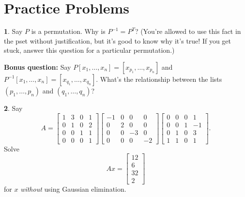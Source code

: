 \documentclass{article}
\theoremstyle{definition}
\newtheorem{prob}{}
\begin{document}
\section*{Practice Problems}
\begin{prob}
	Say $P$ is a permutation. Why is $P^{-1}=P^T$? (You're allowed to use this fact in the pset without justification, but it's good to know why it's true! If you get stuck, answer this question for a particular permutation.)
	
	\vspace{12pt}
	
	\noindent\textbf{Bonus question:} Say $P[x_1, \dots, x_n]=[x_{p_1}, \dots, x_{p_n}]$ and $P^{-1}[x_1, \dots, x_n]=[x_{q_1}, \dots, x_{q_n}]$. What's the relationship between the lists $(p_1, \dots, p_n)$ and $(q_1, \dots, q_n)$?
	
\end{prob}

\begin{prob}
	Say 
	\[A=\begin{bmatrix}
		1& 3& 0& 1\\
		0&1&0&2\\
		0&0&1&1\\
		0&0&0&1
	\end{bmatrix}
\begin{bmatrix}
	-1& 0& 0& 0\\
	0&2&0&0\\
	0&0&-3&0\\
	0&0&0&-2
\end{bmatrix}
\begin{bmatrix}
	0& 0& 0& 1\\
	0&0&1&-1\\
	0&1&0&3\\
	1&1&0&1
\end{bmatrix}.\]
Solve 
\[Ax=\begin{bmatrix}
	12\\6\\32\\2
\end{bmatrix}\]
for $x$ \emph{without} using Gaussian elimination.
\end{prob}
\end{document}
